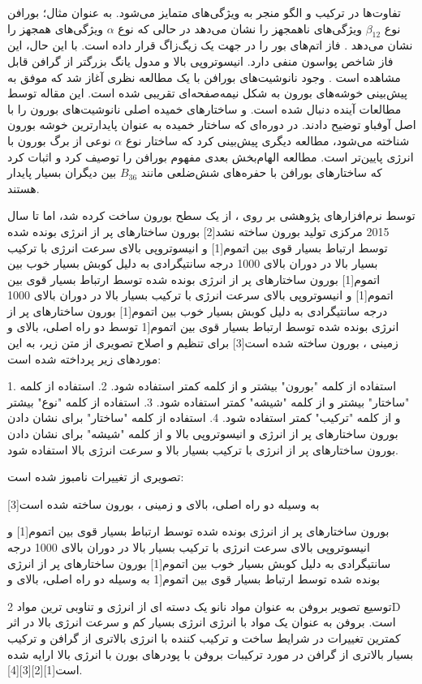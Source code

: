 تفاوت‌ها در ترکیب و الگو منجر به ویژگی‌های متمایز می‌شود. به عنوان مثال؛ بورافن نوع $\beta_{12}$ ویژگی‌های ناهمجهز را نشان می‌دهد  در حالی که نوع $\alpha$ ویژگی‌های همجهز را نشان می‌دهد . فاز  اتم‌های بور را در جهت یک زیگ‌زاگ قرار داده است. با این حال، این فاز شاخص پواسون منفی دارد. انیسوتروپی بالا و مدول یانگ بزرگتر از گرافن قابل مشاهده است . وجود نانوشیت‌های بورافن با یک مطالعه نظری آغاز شد  که موفق به پیش‌بینی خوشه‌های بورون به شکل نیمه‌صفحه‌ای تقریبی شده است. این مقاله توسط مطالعات آینده دنبال شده است.  و  ساختارهای خمیده اصلی نانوشیت‌های بورون  را با اصل آوفباو توضیح دادند. در دوره‌ای که ساختار خمیده به عنوان پایدارترین خوشه بورون شناخته می‌شود، مطالعه دیگری  پیش‌بینی کرد که ساختار نوع $\alpha$ نوعی از برگ بورون با انرژی پایین‌تر است. مطالعه الهام‌بخش بعدی  مفهوم بورافن را توصیف کرد و اثبات کرد که ساختارهای بورافن با حفره‌های شش‌ضلعی مانند $B_{36}$ بین دیگران بسیار پایدار هستند.

توسط نرم‌افزارهای پژوهشی بر روی ، از یک سطح بورون ساخت کرده شد، اما تا سال 2015 مرکزی تولید بورون ساخته نشد[2] بورون ساختارهای پر از انرژی بونده شده توسط ارتباط بسیار قوی بین اتموم[1] و انیسوتروپی بالای سرعت انرژی با ترکیب بسیار بالا در دوران بالای 1000 درجه سانتیگرادی به دلیل کوبش بسیار خوب بین اتموم[1] بورون ساختارهای پر از انرژی بونده شده توسط ارتباط بسیار قوی بین اتموم[1] و انیسوتروپی بالای سرعت انرژی با ترکیب بسیار بالا در دوران بالای 1000 درجه سانتیگرادی به دلیل کوبش بسیار خوب بین اتموم[1] بورون ساختارهای پر از انرژی بونده شده توسط ارتباط بسیار قوی بین اتموم[1 توسط دو راه اصلی، بالای و زمینی ، بورون ساخته شده است[3] برای تنظیم و اصلاح تصویری از متن زیر، به این موردهای زیر پرداخته شده است:

1. استفاده از کلمه "بورون" بیشتر و از کلمه  کمتر استفاده شود.
2. استفاده از کلمه "ساختار" بیشتر و از کلمه "شیشه" کمتر استفاده شود.
3. استفاده از کلمه "نوع" بیشتر و از کلمه "ترکیب" کمتر استفاده شود.
4. استفاده از کلمه "ساختار" برای نشان دادن بورون ساختارهای پر از انرژی و انیسوتروپی بالا و از کلمه "شیشه" برای نشان دادن بورون ساختارهای پر از انرژی با ترکیب بسیار بالا و سرعت انرژی بالا استفاده شود.

تصویری از تغییرات نامبوز شده است:

به وسیله دو راه اصلی، بالای و زمینی ، بورون ساخته شده است[3]

بورون ساختارهای پر از انرژی بونده شده توسط ارتباط بسیار قوی بین اتموم[1] و انیسوتروپی بالای سرعت انرژی با ترکیب بسیار بالا در دوران بالای 1000 درجه سانتیگرادی به دلیل کوبش بسیار خوب بین اتموم[1] بورون ساختارهای پر از انرژی بونده شده توسط ارتباط بسیار قوی بین اتموم[1 به وسیله دو راه اصلی، بالای و

توسیع تصویر بروفن  به عنوان مواد نانو یک دسته ای از انرژی و تناوبی ترین مواد 2D است. بروفن به عنوان یک مواد با انرژی انرژی بسیار کم و سرعت انرژی بالا در اثر کمترین تغییرات در شرایط ساخت و ترکیب کننده با انرژی بالاتری از گرافن و ترکیب بسیار بالاتری از گرافن در مورد ترکیبات بروفن با پودرهای بورن با انرژی بالا ارایه شده است[1][2][3][4].
